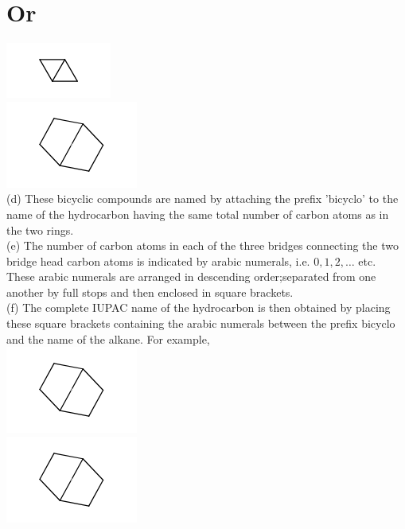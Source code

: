 \documentclass[10pt]{article}
\begin{document}
\section*{Or}
\includegraphics{smile-40e9a68bc8fad681c8f4075d828a002db4bd141f}\\
\includegraphics{smile-440429d18c5ca00817e47d59e63307e392ac6a17}\\
(d) These bicyclic compounds are named by attaching the prefix 'bicyclo' to the name of the hydrocarbon having the same total number of carbon atoms as in the two rings.\\
(e) The number of carbon atoms in each of the three bridges connecting the two bridge head carbon atoms is indicated by arabic numerals, i.e. $0,1,2, \ldots$ etc. These arabic numerals are arranged in descending order;separated from one another by full stops and then enclosed in square brackets.\\
(f) The complete IUPAC name of the hydrocarbon is then obtained by placing these square brackets containing the arabic numerals between the prefix bicyclo and the name of the alkane. For example,\\
\includegraphics{smile-277e4b372e3d87343dc90b5a9f6121fcca88e2b1}\\
\includegraphics{smile-d56470ded9c0909618f9909398e4fc712f49d2e2}\\
\end{document}
